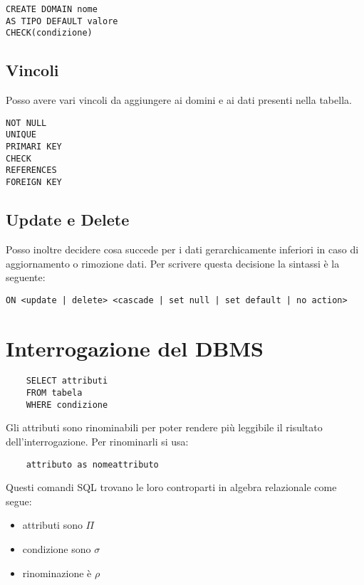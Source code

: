 \begin{lstlisting}
CREATE DOMAIN nome
AS TIPO DEFAULT valore
CHECK(condizione)

\end{lstlisting}


\subsection{Vincoli}

Posso avere vari vincoli da aggiungere ai domini e ai dati presenti nella tabella.

\begin{lstlisting}
NOT NULL
UNIQUE
PRIMARI KEY
CHECK
REFERENCES
FOREIGN KEY
\end{lstlisting}


\subsection{Update e Delete}

Posso inoltre decidere cosa succede per i dati gerarchicamente inferiori in caso di aggiornamento o rimozione dati. Per scrivere questa decisione la sintassi è la seguente:

\begin{lstlisting}
ON <update | delete> <cascade | set null | set default | no action>
\end{lstlisting}

\section{Interrogazione del DBMS}

\begin{lstlisting}
    SELECT attributi
    FROM tabela
    WHERE condizione
\end{lstlisting}

Gli attributi sono rinominabili per poter rendere più leggibile il risultato dell'interrogazione. Per rinominarli si usa:

\begin{lstlisting}
    attributo as nomeattributo
\end{lstlisting}

Questi comandi SQL trovano le loro controparti in algebra relazionale come segue:

\begin{itemize}
    \item attributi sono $\Pi$
    \item condizione sono $\sigma$
    \item rinominazione è $\rho$
\end{itemize}

